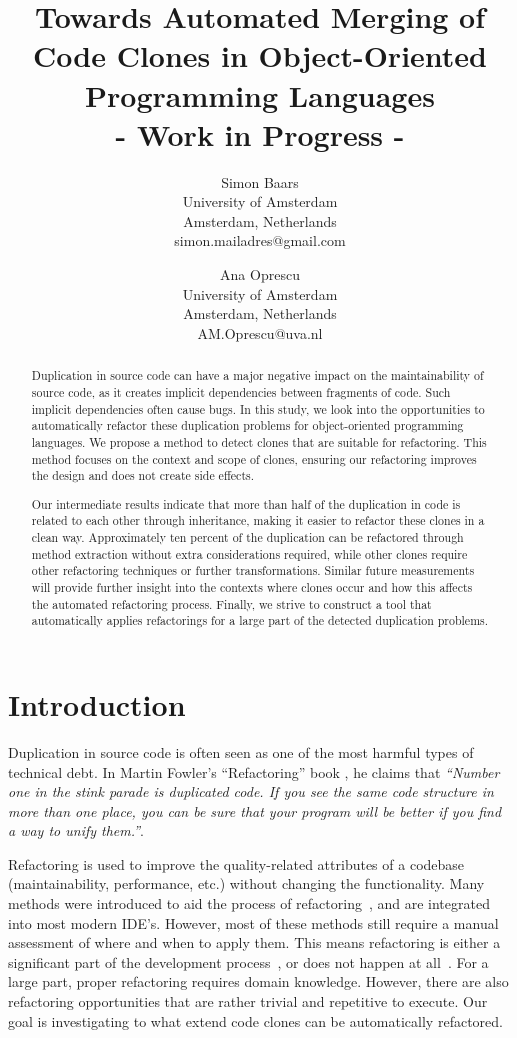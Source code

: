 \documentclass[a4paper]{article}
\title{Towards Automated Merging of Code Clones in Object-Oriented Programming Languages\\- Work in Progress -}
\author{
Simon Baars \\ University of Amsterdam\\
                Amsterdam, Netherlands \\ simon.mailadres@gmail.com
\and
Ana Oprescu \\ University of Amsterdam\\
                Amsterdam, Netherlands \\
                AM.Oprescu@uva.nl
}
\begin{document}
\maketitle

\begin{abstract}
Duplication in source code can have a major negative impact on the maintainability of source code, as it creates implicit dependencies between fragments of code. Such implicit dependencies often cause bugs. In this study, we look into the opportunities to automatically refactor these duplication problems for object-oriented programming languages. We propose a method to detect clones that are suitable for refactoring. This method focuses on the context and scope of clones, ensuring our refactoring improves the design and does not create side effects.

Our intermediate results indicate that more than half of the duplication in code is related to each other through inheritance, making it easier to refactor these clones in a clean way. Approximately ten percent of the duplication can be refactored through method extraction without extra considerations required, while other clones require other refactoring techniques or further transformations. Similar future measurements will provide further insight into the contexts where clones occur and how this affects the automated refactoring process. Finally, we strive to construct a tool that automatically applies refactorings for a large part of the detected duplication problems.
\end{abstract}

\section{Introduction}
Duplication in source code is often seen as one of the most harmful types of technical debt. In Martin Fowler's ``Refactoring'' book \cite{fowler1999refactoring}, he claims that \textit{``Number one in the stink parade is duplicated code. If you see the same code structure in more than one place, you can be sure that your program will be better if you find a way to unify them.''}.

Refactoring is used to improve the quality-related attributes of a codebase (maintainability, performance, etc.) without changing the functionality. Many methods were introduced to aid the process of refactoring~\cite{fowler1999refactoring, wake2004refactoring}, and are integrated into most modern IDE's. However, most of these methods still require a manual assessment of where and when to apply them. This means refactoring is either a significant part of the development process~\cite{lientz1978characteristics, mens2004survey}, or does not happen at all~\cite{mens2003refactoring}. For a large part, proper refactoring requires domain knowledge. However, there are also refactoring opportunities that are rather trivial and repetitive to execute. Our goal is investigating to what extend code clones can be automatically refactored.
\end{document}
